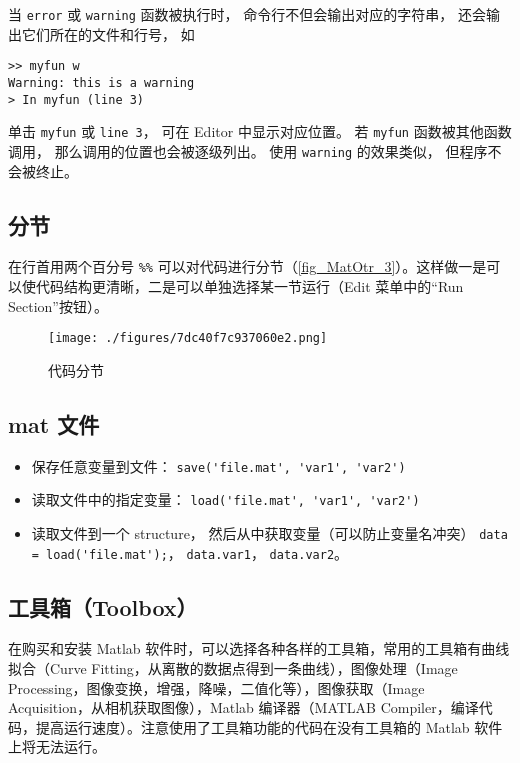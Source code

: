 当 \verb`error` 或 \verb`warning` 函数被执行时， 命令行不但会输出对应的字符串， 还会输出它们所在的文件和行号， 如
\begin{lstlisting}[language=matlabC]
>> myfun w
Warning: this is a warning
> In myfun (line 3)
\end{lstlisting}
单击 \verb`myfun` 或 \verb`line 3`， 可在 Editor 中显示对应位置。 若 \verb`myfun` 函数被其他函数调用， 那么调用的位置也会被逐级列出。 使用 \verb`warning` 的效果类似， 但程序不会被终止。

\subsection{分节}
在行首用两个百分号 \verb`%%` 可以对代码进行分节（\autoref{fig_MatOtr_3}）。这样做一是可以使代码结构更清晰，二是可以单独选择某一节运行（Edit 菜单中的“Run Section”按钮）。
\begin{figure}[ht]
\centering
\texttt{[image: ./figures/7dc40f7c937060e2.png]}
\caption{代码分节}\label{fig_MatOtr_3}
\end{figure}

\subsection{mat 文件}
\begin{itemize}
\item 保存任意变量到文件： \verb`save('file.mat', 'var1', 'var2')`
\item 读取文件中的指定变量： \verb`load('file.mat', 'var1', 'var2')`
\item 读取文件到一个 structure， 然后从中获取变量（可以防止变量名冲突） \verb`data = load('file.mat');`， \verb`data.var1`， \verb`data.var2`。
\end{itemize}


\subsection{工具箱（Toolbox）}
在购买和安装 Matlab 软件时，可以选择各种各样的工具箱，常用的工具箱有曲线拟合（Curve Fitting，从离散的数据点得到一条曲线），图像处理（Image Processing，图像变换，增强，降噪，二值化等），图像获取（Image Acquisition，从相机获取图像），Matlab 编译器（MATLAB Compiler，编译代码，提高运行速度）。注意使用了工具箱功能的代码在没有工具箱的 Matlab 软件上将无法运行。




